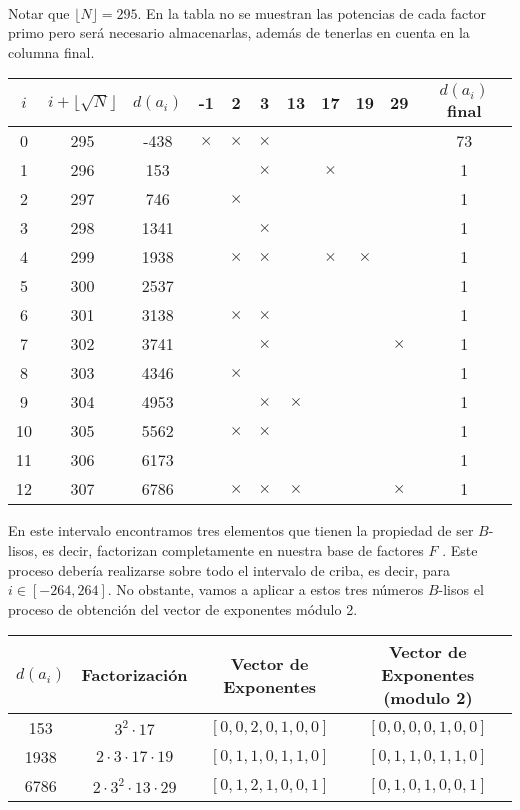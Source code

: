 \documentclass[11pt, conference]{IEEEtran}
\begin{document}
\

Notar que $\lfloor N\rfloor = 295$. En la tabla no se muestran las potencias de cada factor primo pero será necesario almacenarlas, además de tenerlas en cuenta en la columna final.

\begin{table}[htb]
	\begin{center}
		\begin{tabular}{|c|c|c|c|c|c|c|c|c|c|c|}
			\hline
			$i$ & $i+\lfloor\sqrt{N}\rfloor$ & $d(a_i)$ & -1&2&3&13&17&19&29&$d(a_i)$ final\\
			\hline\hline
			0&295&-438&$\times$&$\times$&$\times$& & & & & 73\\
			\hline
			1&296&153&&&$\times$& &$\times$& & & 1\\
			\hline
			2&297&746&&$\times$&& && & & 1\\
			\hline
			3&298&1341&&&$\times$& && & & 1\\
			\hline
			4&299&1938&&$\times$&$\times$& &$\times$&$\times$& & 1\\
			\hline
			5&300&2537&&&& && & & 1\\
			\hline
			6&301&3138&&$\times$&$\times$& && & & 1\\
			\hline
			7&302&3741&&&$\times$&&& & $\times$& 1\\
			\hline
			8&303&4346&&$\times$&& && & & 1\\
			\hline
			9&304&4953&&&$\times$&$\times$&& & & 1\\
			\hline
			10&305&5562&&$\times$&$\times$& && & & 1\\
			\hline
			11&306&6173&&&& && & & 1\\
			\hline
			12&307&6786&&$\times$&$\times$&$\times$&& &$\times$& 1\\
			\hline
		\end{tabular}
	\end{center}
\end{table}
En este intervalo encontramos tres elementos que tienen la propiedad de ser $B$-lisos, es decir, factorizan completamente en nuestra base de factores $F$ .
Este proceso debería realizarse sobre todo el intervalo de criba, es decir, para $i \in [-264, 264]$. No obstante, vamos a aplicar a estos tres números $B$-lisos el proceso de obtención del vector de exponentes módulo 2.
\begin{table}[htb]
	\begin{center}
		\begin{tabular}{|c|c|c|c|}
			\hline
			$d(a_i)$ & Factorización & Vector de Exponentes & Vector de Exponentes (modulo 2)\\
			\hline
			153&$3^2\cdot17$&$[0,0,2,0,1,0,0]$&$[0,0,0,0,1,0,0]$\\
			\hline
			1938&$2\cdot3\cdot17\cdot19$&$[0,1,1,0,1,1,0]$&$[0,1,1,0,1,1,0]$\\
			\hline
			6786&$2\cdot3^2\cdot13\cdot29$&$[0,1,2,1,0,0,1]$&$[0,1,0,1,0,0,1]$\\
			\hline
		\end{tabular}
	\end{center}
\end{table}
\end{document}
